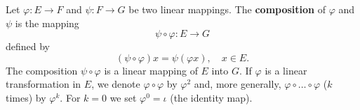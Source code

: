 Let $\varphi: E \rightarrow F$ and $\psi: F \rightarrow G$ be two linear mappings. The \textbf{composition} of $\varphi$ and $\psi$ is the mapping
$$
\psi \circ \varphi: E \rightarrow G
$$
defined by
$$
(\psi \circ \varphi) x = \psi(\varphi x), \quad x \in E.
$$
The composition $\psi \circ \varphi$ is a linear mapping of $E$ into $G$. If $\varphi$ is a linear transformation in $E$, we denote $\varphi \circ \varphi$ by $\varphi^2$ and, more generally, $\varphi \circ \dots \circ \varphi$ ($k$ times) by $\varphi^k$. For $k = 0$ we set $\varphi^0 = \iota$ (the identity map).
